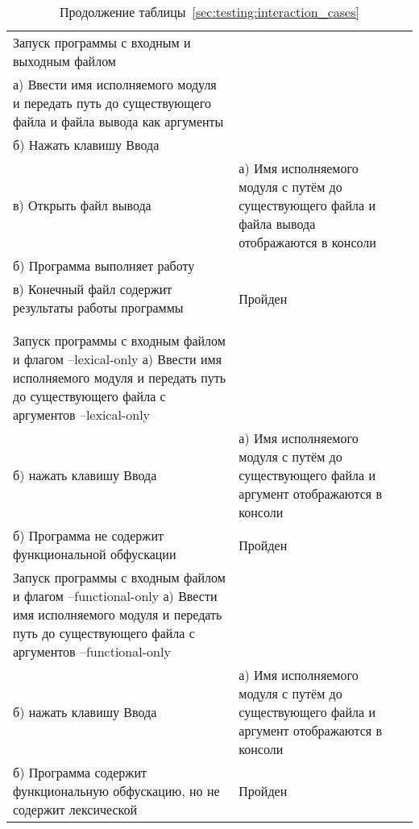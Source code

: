 \begin{longtable}[l]{| >{\raggedright}m{}
                  | >{\raggedright}m{}
                  | >{\raggedright\arraybackslash}m{}|}
   Запуск программы с входным и выходным файлом \\
   а) Ввести имя исполняемого модуля и передать путь до существующего файла и файла вывода как аргументы \\
   б) Нажать клавишу Ввода \\
   в) Открыть файл вывода
   &
   а) Имя исполняемого модуля с путём до существующего файла и файла вывода отображаются в консоли \\
   б) Программа выполняет работу \\
   в) Конечный файл содержит результаты работы программы
   &
   Пройден \\
  \pagebreak
  \caption*{Продолжение таблицы~\ref{sec:testing:interaction_cases}} \\
   \hline
   \centering 1 & \centering 2 & \centering 3 \tabularnewline
   \hline
   Запуск программы с входным файлом и флагом --lexical-only
   а) Ввести имя исполняемого модуля и передать путь до существующего файла с аргументов --lexical-only \\
   б) нажать клавишу Ввода
   &
   а) Имя исполняемого модуля с путём до существующего файла и аргумент отображаются в консоли \\
   б) Программа не содержит функциональной обфускации
   &
   Пройден \\
   \hline
   Запуск программы с входным файлом и флагом --functional-only
   а) Ввести имя исполняемого модуля и передать путь до существующего файла с аргументов --functional-only \\
   б) нажать клавишу Ввода
   &
   а) Имя исполняемого модуля с путём до существующего файла и аргумент отображаются в консоли \\
   б) Программа содержит функциональную обфускацию, но не содержит лексической
   &
   Пройден \\
   \hline
\end{longtable}





